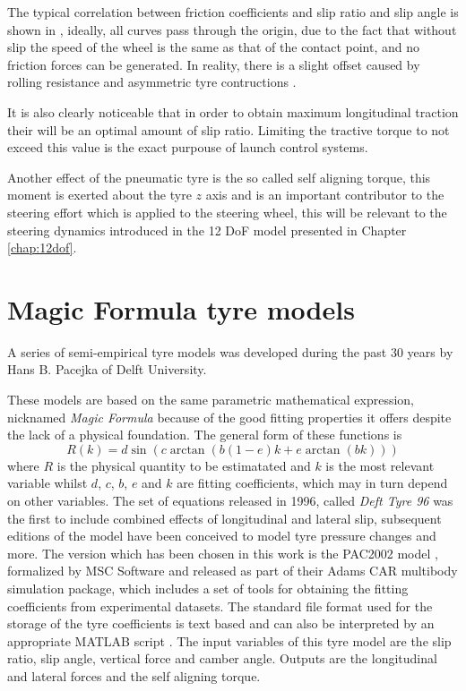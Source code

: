 The typical correlation between friction coefficients and slip ratio and slip angle is shown in
, ideally, all curves pass through the origin, due to the fact that without slip the speed of the wheel is the same as that of the contact point, and no friction forces can be generated. In reality, there is a slight offset caused by rolling resistance and asymmetric tyre contructions .

It is also clearly noticeable that in order to obtain maximum longitudinal traction their will be an optimal amount of slip ratio. Limiting the tractive torque to not exceed this value is the exact purpouse of launch control systems.

Another effect of the pneumatic tyre is the so called self aligning torque, this moment is exerted about the tyre $z$ axis and is an important contributor to the steering effort which is applied to the steering wheel, this will be relevant to the steering dynamics introduced in the 12 DoF model presented in Chapter \ref{chap:12dof}.

\section{Magic Formula tyre models}
\label{sec:mf}
A series of semi-empirical tyre models was developed during the past 30 years by Hans B. Pacejka of Delft University.

These models are based on the same parametric mathematical expression, nicknamed \textit{Magic Formula} because of the good fitting properties it offers despite the lack of a physical foundation. The general form of these functions is
$$ R(k) = d\sin(c\arctan(b(1-e)k+e\arctan(bk))) $$
where $R$ is the physical quantity to be estimatated and $k$ is the most relevant variable whilst $d$, $c$, $b$, $e$ and $k$ are fitting coefficients, which may in turn depend on other variables.
The set of equations released in 1996, called \textit{Deft Tyre 96}  was the first to include combined effects of longitudinal and lateral slip, subsequent editions of the model have been conceived to model tyre pressure changes  and more.
The version which has been chosen in this work is the PAC2002 model , formalized by MSC Software and released as part of their Adams CAR multibody simulation package, which includes a set of tools for obtaining the fitting coefficients from experimental datasets. The standard file format used for the storage of the tyre coefficients is text based and can also be interpreted by an appropriate MATLAB script .
The input variables of this tyre model are the slip ratio, slip angle, vertical force and camber angle. Outputs are the longitudinal and lateral forces and the self aligning torque.

